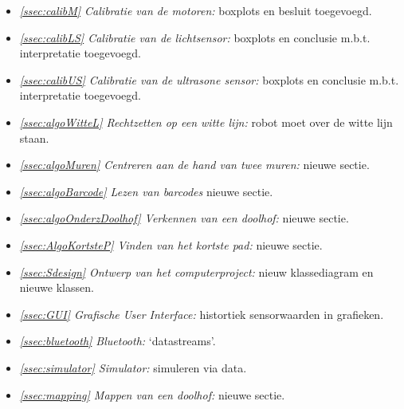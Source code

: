 \documentclass[tt3]{penoverslag}
\begin{document}
\begin{itemize}
\item \textit{\ref{ssec:calibM} Calibratie van de motoren:} boxplots en besluit toegevoegd.
\item \textit{\ref{ssec:calibLS} Calibratie van de lichtsensor:} boxplots en conclusie m.b.t. interpretatie toegevoegd.
\item \textit{\ref{ssec:calibUS} Calibratie van de ultrasone sensor:} boxplots en conclusie m.b.t. interpretatie toegevoegd.
\item \textit{\ref{ssec:algoWitteL} Rechtzetten op een witte lijn:} robot moet over de witte lijn staan.
\item \textit{\ref{ssec:algoMuren} Centreren aan de hand van twee muren:} nieuwe sectie.
\item \textit{\ref{ssec:algoBarcode} Lezen van barcodes} nieuwe sectie.
\item \textit{\ref{ssec:algoOnderzDoolhof} Verkennen van een doolhof:} nieuwe sectie.
\item \textit{\ref{ssec:AlgoKortsteP} Vinden van het kortste pad:} nieuwe sectie.
\item \textit{\ref{ssec:Sdesign} Ontwerp van het computerproject:} nieuw klassediagram en nieuwe klassen.
\item \textit{\ref{ssec:GUI} Grafische User Interface:} histortiek sensorwaarden in grafieken.
\item \textit{\ref{ssec:bluetooth} Bluetooth:} `datastreams'.
\item \textit{\ref{ssec:simulator} Simulator:} simuleren via data.
\item \textit{\ref{ssec:mapping} Mappen van een doolhof:} nieuwe sectie.
\end{itemize}



\end{document}
